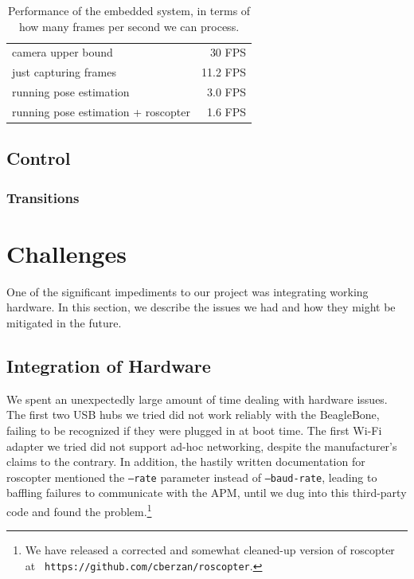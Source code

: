 \documentclass[10pt]{scrartcl} %
\begin{document}
\begin{table}[h!]
    \centering
    \begin{tabular}{lr}
        camera upper bound                      &   30 FPS \\
        just capturing frames                   &   11.2 FPS \\
        running pose estimation                 &   3.0 FPS \\
        running pose estimation + roscopter     &   1.6 FPS \\
    \end{tabular}
    \caption{
        Performance of the embedded system, in terms of how many frames per
        second we can process.
    }
    \label{tab:fps}
\end{table}


\subsection{Control}


\subsubsection{Transitions}


\section{Challenges}
One of the significant impediments to our project was integrating working hardware. In this section, we describe the issues we had and how they might be mitigated in the future.

\subsection{Integration of Hardware}

We spent an unexpectedly large amount of time dealing with hardware issues. The
first two USB hubs we tried did not work reliably with the BeagleBone, failing
to be recognized if they were plugged in at boot time. The first Wi-Fi adapter
we tried did not support ad-hoc networking, despite the manufacturer's claims
to the contrary. In addition, the hastily written documentation for roscopter
mentioned the {\tt --rate} parameter instead of {\tt --baud-rate}, leading to
baffling failures to communicate with the APM, until we dug into this
third-party code and found the problem.\footnote{We have released a corrected
and somewhat cleaned-up version of roscopter at {\tt
https://github.com/cberzan/roscopter}.}
\end{document}
